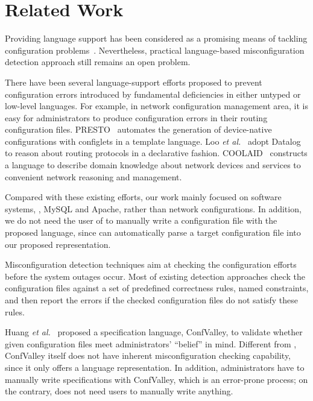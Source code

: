 
\section{Related Work}

Providing language support has been considered as a promising means
of tackling configuration problems~\cite{xu15systems}.
Nevertheless, practical language-based misconfiguration
detection approach still remains an open problem.

There have been several language-support efforts proposed to prevent
configuration errors introduced by fundamental deficiencies in
either untyped or low-level languages. For example, in network
configuration management area, it is easy for administrators to
produce configuration errors in their routing configuration files.
PRESTO~\cite{enck07configuration} 
automates the generation of device-native configurations
with configlets in a template language. 
Loo {\em et al.}~\cite{loo05declarative} adopt Datalog to reason about 
routing protocols in a declarative fashion. 
COOLAID~\cite{chen10declarative} constructs
a language to describe domain knowledge about network devices and
services to convenient network reasoning and management.

Compared with these existing efforts, 
our work mainly focused on software systems, \eg, MySQL and Apache,
rather than network configurations. In addition, we do not need 
the user of \app to manually write a configuration file with the proposed
language, since \app can automatically parse a target configuration
file into our proposed representation.

Misconfiguration detection techniques aim at checking the configuration
efforts before the system outages occur.
Most of existing detection approaches check 
the configuration files against a set of predefined correctness 
rules, named constraints, and then report the errors if 
the checked configuration files do not satisfy these rules.

Huang {\em et al.}~\cite{huang15confvalley} proposed a specification 
language, ConfValley, to validate 
whether given configuration files meet administrators' 
``belief'' in mind. Different from \app, ConfValley itself does not
have inherent misconfiguration checking capability, since it only offers
a language representation. In addition, administrators have to
manually write specifications with ConfValley, which is an error-prone
process; on the contrary, \app does not need users to manually
write anything.

